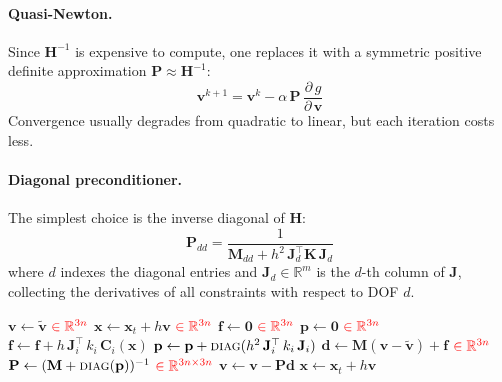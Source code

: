 \documentclass{article}
\newcommand{\pd}[2]{\dfrac{\partial\, #1}{\partial\, #2}}
\newcommand{\red}[1]{\textcolor{red}{#1}}
\begin{document}
\paragraph{Quasi-Newton.}
Since $\mathbf{H}^{-1}$ is expensive to compute, one replaces it with a 
symmetric positive definite approximation $\mathbf{P} \approx \mathbf{H}^{-1}$:
\begin{equation}
    \mathbf{v}^{k+1} = \mathbf{v}^k - \alpha\,\mathbf{P}\,\pd{g}{\mathbf{v}}
\end{equation}
Convergence usually degrades from quadratic to linear, but each iteration costs 
less.

\paragraph{Diagonal preconditioner.}
The simplest choice is the inverse diagonal of $\mathbf{H}$:
\begin{equation}
\label{eq:diagonal_prec}
    \mathbf{P}_{dd} = \frac{1}{\mathbf{M}_{dd} + h^2\,\mathbf{J}_d^\top \mathbf{K}\,\mathbf{J}_d}
\end{equation}
where $d$ indexes the diagonal entries and $\mathbf{J}_d \in \mathbb{R}^m$ is the $d$-th column of $\mathbf{J}$, collecting the derivatives of all constraints with respect to DOF $d$.

\begin{algorithm}[H]
\caption{Primal Descent Time Step}
\begin{algorithmic}[1]
    \State $\mathbf{v} \gets \tilde{\mathbf{v}}$ 
    \hfill $\red{\in \mathbb{R}^{3n}}$
    \State $\mathbf{x} \gets \mathbf{x}_t + h\mathbf{v}$ 
    \hfill $\red{\in \mathbb{R}^{3n}}$
        \State $\mathbf{f} \gets \mathbf{0}$ 
        \hfill $\red{\in \mathbb{R}^{3n}}$
        \State $\mathbf{p} \gets \mathbf{0}$ 
        \hfill $\red{\in \mathbb{R}^{3n}}$
            \State $\mathbf{f} \gets \mathbf{f} + h\,\mathbf{J}_i^\top\,k_{i}\, \mathbf{C}_i(\mathbf{x})$
            \State $\mathbf{p} \gets \mathbf{p} + \textsc{diag}(h^2\,\mathbf{J}_i^\top\,k_{i}\,\mathbf{J}_i)$
        \EndFor
    \State $\mathbf{d} \gets \mathbf{M}(\mathbf{v} - \tilde{\mathbf{v}}) + \mathbf{f}$
    \hfill $\red{\in \mathbb{R}^{3n}}$
    \State $\mathbf{P} \gets (\mathbf{M} + \textsc{diag}(\mathbf{p}))^{-1}$
    \hfill $\red{\in \mathbb{R}^{3n \times 3n}}$
    \State $\mathbf{v} \gets \mathbf{v} - \mathbf{P}\mathbf{d}$
    \State $\mathbf{x} \gets \mathbf{x}_t + h\mathbf{v}$
    \EndFor
\EndFunction
\end{algorithmic}
\end{algorithm}
\end{document}

